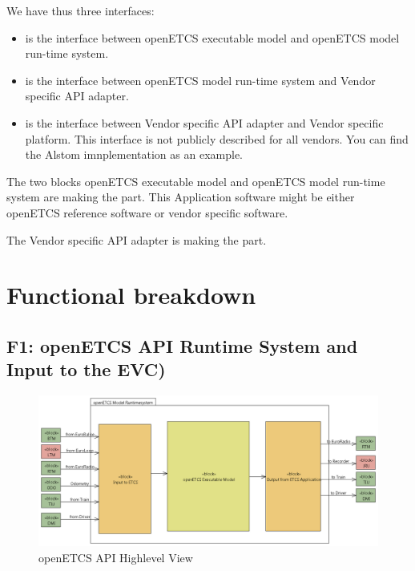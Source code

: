 \documentclass{template/openetcs_report}
\begin{document}
We have thus three interfaces:
\begin{itemize}
\item {}
 is the interface between openETCS
  executable model and openETCS model run-time system. 
\item {}
 is the interface between openETCS model
  run-time system and Vendor specific \gls{API} adapter.
\item {}
 is the interface between Vendor
  specific \gls{API} adapter and Vendor specific platform. This interface is
  not publicly described for all vendors. You can find the Alstom imnplementation as an example.
\end{itemize}

The two blocks openETCS executable model and openETCS model run-time
system are making the  part. This Application software might be either openETCS reference software or
vendor specific software.

The Vendor specific \gls{API} adapter is making the  part.


\section{Functional breakdown}


\subsection{F1: openETCS \gls{API} Runtime System and Input to the EVC)}
\label{chp_openETCS_API}

\begin{figure}[hbtp]
\centering
\includegraphics[width=\linewidth]{openETCSAPI.png}
\caption{openETCS API Highlevel View}
\label{fig:apiHighLevel}
\end{figure}
\end{document}
